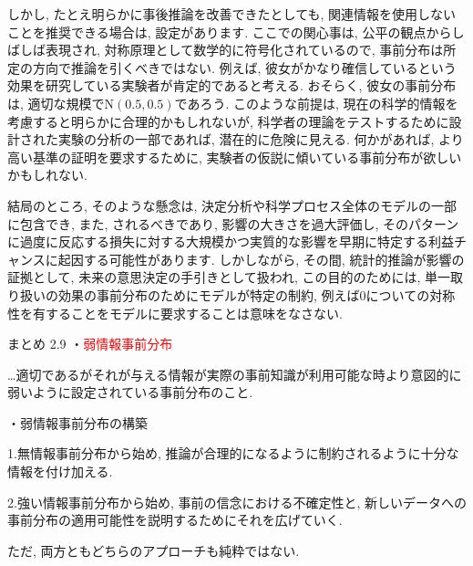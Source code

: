 \documentclass[10pt,dvipdfmx,a4]{beamer}
\newcommand{\tcr}[1]{\textcolor{red}{#1}}
\begin{document}

\begin{frame}
しかし, たとえ明らかに事後推論を改善できたとしても, 関連情報を使用しないことを推奨できる場合は, 設定があります.
ここでの関心事は, 公平の観点からしばしば表現され, 対称原理として数学的に符号化されているので, 事前分布は所定の方向で推論を引くべきではない.
例えば, 彼女がかなり確信しているという効果を研究している実験者が肯定的であると考える.
おそらく, 彼女の事前分布は, 適切な規模で$\text{N}(0.5, 0.5)$であろう.
このような前提は, 現在の科学的情報を考慮すると明らかに合理的かもしれないが, 科学者の理論をテストするために設計された実験の分析の一部であれば, 潜在的に危険に見える.
何かがあれば, より高い基準の証明を要求するために, 実験者の仮説に傾いている事前分布が欲しいかもしれない.

結局のところ, そのような懸念は, 決定分析や科学プロセス全体のモデルの一部に包含でき, また, されるべきであり, 影響の大きさを過大評価し, そのパターンに過度に反応する損失に対する大規模かつ実質的な影響を早期に特定する利益チャンスに起因する可能性があります.
しかしながら, その間, 統計的推論が影響の証拠として, 未来の意思決定の手引きとして扱われ, この目的のためには, 単一取り扱いの効果の事前分布のためにモデルが特定の制約, 例えば0についての対称性を有することをモデルに要求することは意味をなさない.
\end{frame}


\begin{frame}[t]{まとめ 2.9}
・\tcr{弱情報事前分布}

…適切であるがそれが与える情報が実際の事前知識が利用可能な時より意図的に弱いように設定されている事前分布のこと.

・弱情報事前分布の構築

1.無情報事前分布から始め, 推論が合理的になるように制約されるように十分な情報を付け加える.

2.強い情報事前分布から始め, 事前の信念における不確定性と, 新しいデータへの事前分布の適用可能性を説明するためにそれを広げていく.

ただ, 両方ともどちらのアプローチも純粋ではない.
\end{frame}


\end{document}
